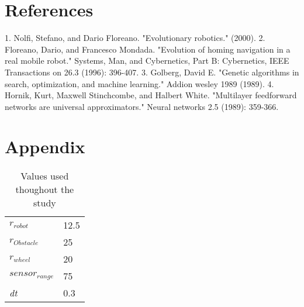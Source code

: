 \documentclass[12pt]{elsarticle}
\begin{document}
\section{References}

\hspace{-0.25in}1. Nolfi, Stefano, and Dario Floreano. "Evolutionary robotics." (2000). \newline{}
2. Floreano, Dario, and Francesco Mondada. "Evolution of homing navigation in a real mobile robot." Systems, Man, and Cybernetics, Part B: Cybernetics, IEEE Transactions on 26.3 (1996): 396-407.\newline{}
3. Golberg, David E. "Genetic algorithms in search, optimization, and machine learning." Addion wesley 1989 (1989).\newline{}
4. Hornik, Kurt, Maxwell Stinchcombe, and Halbert White. "Multilayer feedforward networks are universal approximators." Neural networks 2.5 (1989): 359-366.

\section{Appendix}
\begin{table}[h]
\centering
\caption{Values used thoughout the study}
\label{my-label}
\begin{tabular}{|l|l|}
$r_{robot}$           & 12.5      \\
$r_{Obstacle}$      & 25 \\
$r_{wheel}$    & 20 \\
$sensor_{range}$  & 75 \\
\textit{dt} & 0.3 \\


        
\end{tabular}
\end{table}
\end{document}
